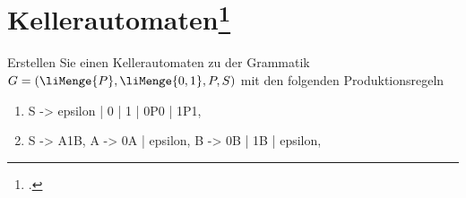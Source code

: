 \documentclass{lehramt-informatik-aufgabe}
\begin{document}
\let\m=\liMenge


\section{Kellerautomaten\footcite[Seite 27]{theo:fs:2}}

Erstellen Sie einen Kellerautomaten zu der Grammatik $G = (\m{P} , \m{0,
1}, P, S)$ mit den folgenden Produktionsregeln

\begin{enumerate}

%

\item

\begin{liProduktionsRegeln}
S -> epsilon | 0 | 1 | 0P0 | 1P1,
\end{liProduktionsRegeln}

\begin{liAntwort}
\end{liAntwort}

%

\item

\begin{liProduktionsRegeln}
S -> A1B,
A -> 0A | epsilon,
B -> 0B | 1B | epsilon,
\end{liProduktionsRegeln}
\end{enumerate}

\begin{liAntwort}
\end{liAntwort}
\end{document}
